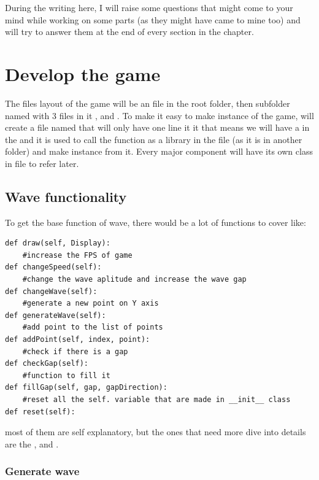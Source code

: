 During the writing here, I will raise some questions that might come to your mind while working on some parts (as they might have came to mine too) and will try to answer them at the end of every section in the chapter.

\section{Develop the game}\label{develop-the-game}

The files layout of the game will be an  file in the root folder, then subfolder named  with 3 files in it ,  and . To make it easy to make instance of the game, will create a file named  that will only have one line it it  that means we will have a  in the  and it is used to call the  function as a library in the  file (as it is in another folder) and make instance from it. Every major component will have its own class in file to refer later. 

\subsection{Wave functionality}\label{wave-functionality}
To get the base function of wave, there would be a lot of functions to cover like:

\begin{verbatim}
def draw(self, Display):
	#increase the FPS of game
def changeSpeed(self):
	#change the wave aplitude and increase the wave gap
def changeWave(self):
	#generate a new point on Y axis
def generateWave(self):
	#add point to the list of points
def addPoint(self, index, point):
	#check if there is a gap 
def checkGap(self):
	#function to fill it
def fillGap(self, gap, gapDirection):
	#reset all the self. variable that are made in __init__ class 
def reset(self):
\end{verbatim}

most of them are self explanatory, but the ones that need more dive into details are the ,  and .

\subsubsection{Generate wave}


